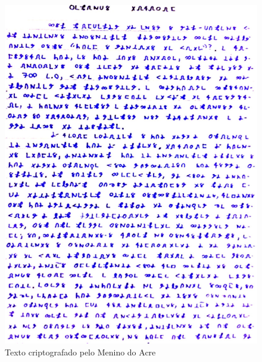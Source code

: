\begin{figure}[htbp]
  \centering
  \includegraphics[width=.8\textwidth]{imagens/bruno.jpg}
  \caption{Texto criptografado pelo Menino do Acre}
  \label{fig:menino-do-acre}
\end{figure}


